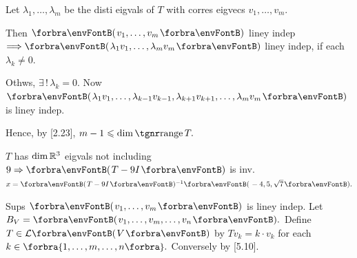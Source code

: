 \par\quad
Let $\lambda_1,\dots,\lambda_m$ be the disti eigvals of $T$ with corres eigvecs $v_1,\dots,v_m.$\par\quad
{}\par\quad
Then $\Par{v_1,\dots,v_m}$ liney indep $\Longrightarrow\Par{\lambda_1 v_1,\dots,\lambda_m v_m}$ liney indep, if each $\lambda_k\neq 0.$\par\quad
Othws, $\exists\,!\,\lambda_k=0.$ Now $\Par{\lambda_1v_1,\dots,\lambda_{k-1}v_{k-1},\lambda_{k+1}v_{k+1},\dots,\lambda_mv_m}$ is liney indep.\par\quad
Hence, by [2.23], $m-1\leqslant\dim\range T.$\PfEnd
\SepLine

$T$ has $\dim{\mathbb{R}}^3$ eigvals not including $9\Rightarrow\Par{T-9I}$ is inv. $x=\Par{T-9I}{^{-1}}\Par{-4,5,\sqrt{7}}.$\PfEnd
\SepLine

Sups $\Par{v_1,\dots,v_m}$ is liney indep. Let $B_V=\Par{v_1,\dots,v_m,\dots,v_n}.$\parSol{}
Define $T\in\Lm{V}$ by $Tv_k=k\cdot v_k$ for each $k\in\Bra{1,\dots,m,\dots,n}.$ Conversely by [5.10].\PfEnd\vspace{-4pt}
\SepLine

